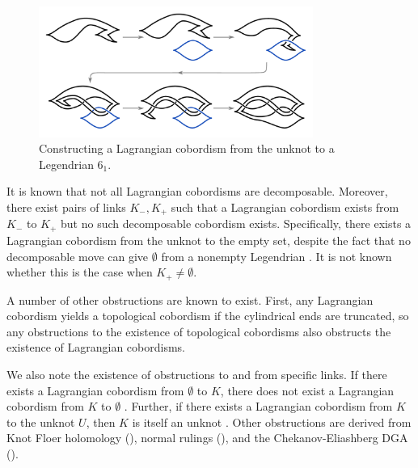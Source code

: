 \begin{figure}[ht!]
    \centering
    \includegraphics[width=0.8\textwidth]{images/cobordism-movie.pdf}
    \caption{Constructing a Lagrangian cobordism from the unknot to a Legendrian $6_1$.}
    \label{fig:cobordism-construction}
\end{figure}

It is known that not all Lagrangian cobordisms are decomposable. Moreover, there exist pairs of links $K_-, K_+$ such that a Lagrangian cobordism exists from $K_-$ to $K_+$ but no such decomposable cobordism exists. Specifically, there exists a Lagrangian cobordism from the unknot to the empty set, despite the fact that no decomposable move can give $\emptyset$ from a nonempty Legendrian \cite{lin}. It is not known whether this is the case when $K_+ \neq \emptyset$.

A number of other obstructions are known to exist.
First, any Lagrangian cobordism yields a topological cobordism if the cylindrical ends are truncated, so any obstructions to the existence of topological cobordisms also obstructs the existence of Lagrangian cobordisms.

We also note the existence of obstructions to and from specific links. If there exists a Lagrangian cobordism from $\emptyset$ to $K$, there does not exist a Lagrangian cobordism from $K$ to $\emptyset$ \cite{gromov}. Further, if there exists a Lagrangian cobordism from $K$ to the unknot $U$, then $K$ is itself an unknot \cite{cornwell}.
Other obstructions are derived from Knot Floer holomology (\cite{baldwin}), normal rulings (\cite{cornwell}), and the Chekanov-Eliashberg DGA (\cite{pan}). 



